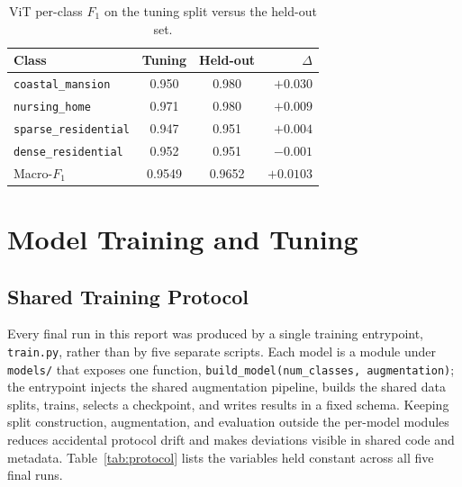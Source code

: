 \documentclass[11pt,twoside,a4paper]{article}
\begin{document}
\begin{table}[H]
\centering
\caption{ViT per-class $F_1$ on the tuning split versus the held-out set.}
\label{tab:vit-bias}
\small
\begin{tabular}{lccr}
\toprule
Class & Tuning & Held-out & $\Delta$ \\
\midrule
\texttt{coastal\_mansion}    & 0.950 & 0.980 & $+0.030$ \\
\texttt{nursing\_home}       & 0.971 & 0.980 & $+0.009$ \\
\texttt{sparse\_residential} & 0.947 & 0.951 & $+0.004$ \\
\texttt{dense\_residential}  & 0.952 & 0.951 & $-0.001$ \\
\midrule
Macro-$F_1$ & 0.9549 & 0.9652 & $+0.0103$ \\
\bottomrule
\end{tabular}
\end{table}

\section{Model Training and Tuning}
\label{sec:training}

\subsection{Shared Training Protocol}

Every final run in this report was produced by a single training entrypoint,
\texttt{train.py}, rather than by five separate scripts. Each model is a module
under \texttt{models/} that exposes one function,
\texttt{build\_model(num\_classes, augmentation)}; the entrypoint injects the
shared augmentation pipeline, builds the shared data splits, trains, selects a
checkpoint, and writes results in a fixed schema. Keeping split construction,
augmentation, and evaluation outside the per-model modules reduces accidental
protocol drift and makes deviations visible in shared code and metadata.
Table~\ref{tab:protocol} lists the variables held constant across all five
final runs.
\end{document}
